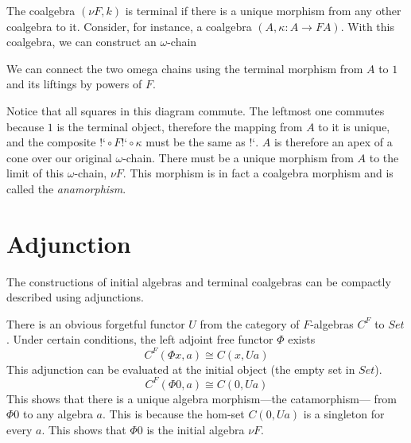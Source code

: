 \documentclass[11pt]{amsart}
\begin{document}
The coalgebra $(\nu F, k)$ is terminal if there is a unique morphism from any other coalgebra to it. Consider, for instance, a coalgebra $(A, \kappa \colon A \to F A)$. With this coalgebra, we can construct an $\omega$-chain
\begin{figure}[H]
\centering
{}
\end{figure}

We can connect the two omega chains using the terminal morphism from $A$ to $1$ and its liftings by powers of $F$.

\begin{figure}[H]
\centering
{}
\end{figure}

Notice that all squares in this diagram commute. The leftmost one commutes because $1$ is the terminal object, therefore the mapping from $A$ to it is unique, and the composite $\mbox{!`} \circ F \mbox{!`} \circ \kappa$ must be the same as $\mbox{!`}$. $A$ is therefore an apex of a cone over our original $\omega$-chain. There must be a unique morphism from $A$ to the limit of this $\omega$-chain, $\nu F$. This morphism is in fact a coalgebra morphism and is called the \emph{anamorphism}.

\section{Adjunction}
The constructions of initial algebras and terminal coalgebras can be compactly described using adjunctions.

There is an obvious forgetful functor $U$ from the category of $F$-algebras $C^F$ to $Set$. Under certain conditions, the left adjoint free functor $\Phi$ exists
\[C^F ( \Phi x, a) \cong C(x, U a)\]
This adjunction can be evaluated at the initial object (the empty set in $Set$). 
\[C^F ( \Phi 0, a) \cong C(0, U a)\]
This shows that there is a unique algebra morphism---the catamorphism--- from $\Phi 0$ to any algebra $a$. This is because the hom-set $C(0, U a)$ is a singleton for every $a$. This shows that $\Phi 0$ is the initial algebra $\nu F$. 
\end{document}

